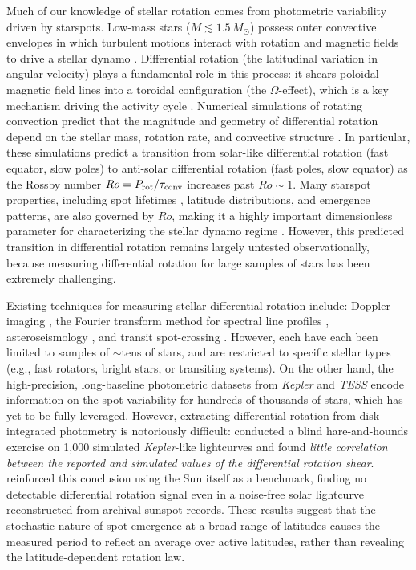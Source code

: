 \documentclass[preprint]{aastex702}
\newcommand{\kepler}{{\it Kepler}\xspace}
\newcommand{\tess}{{\it TESS}\xspace}
\begin{document}
Much of our knowledge of stellar rotation comes from photometric variability driven by starspots. Low-mass stars ($M \lesssim 1.5 \, M_{\odot}$) possess outer convective envelopes in which turbulent motions interact with rotation and magnetic fields to drive a stellar dynamo \citep{brun_differential_2017}. Differential rotation (the latitudinal variation in angular velocity) plays a fundamental role in this process: it shears poloidal magnetic field lines into a toroidal configuration (the $\Omega$-effect), which is a key mechanism driving the activity cycle \citep{noraz_impact_2022}. Numerical simulations of rotating convection predict that the magnitude and geometry of differential rotation depend on the stellar mass, rotation rate, and convective structure \citep{augustson_convection_2012,guerrero_differential_2013,kapyla_simulations_2023}. In particular, these simulations predict a transition from solar-like differential rotation (fast equator, slow poles) to anti-solar differential rotation (fast poles, slow equator) as the Rossby number $Ro = P_{\rm rot}/\tau_{\rm conv}$ increases past $Ro \sim 1$. Many starspot properties, including spot lifetimes \citep{giles_kepler_2017}, latitude distributions, and emergence patterns, are also governed by $Ro$, making it a highly important dimensionless parameter for characterizing the stellar dynamo regime \citep{gastine_solarlike_2013,noraz_hunting_2022}. However, this predicted transition in differential rotation remains largely untested observationally, because measuring differential rotation for large samples of stars has been extremely challenging.

Existing techniques for measuring stellar differential rotation include: Doppler imaging \citep{collier_cameron_differential_2007}, the Fourier transform method for spectral line profiles \citep{reiners_radius-dependent_2012}, asteroseismology \citep{benomar_asteroseismic_2018}, and transit spot-crossing \citep{morris_starspots_2017}. However, each have each been limited to samples of $\sim$tens of stars, and are restricted to specific stellar types (e.g., fast rotators, bright stars, or transiting systems). On the other hand, the high-precision, long-baseline photometric datasets from \kepler and \tess encode information on the spot variability for hundreds of thousands of stars, which has yet to be fully leveraged. However, extracting differential rotation from disk-integrated photometry is notoriously difficult: \citet{aigrain_testing_2015} conducted a blind hare-and-hounds exercise on 1,000 simulated \kepler-like lightcurves and found \emph{little correlation between the reported and simulated values of the differential rotation shear}. \citet{morris_solar_2019} reinforced this conclusion using the Sun itself as a benchmark, finding no detectable differential rotation signal even in a noise-free solar lightcurve reconstructed from archival sunspot records. These results suggest that the stochastic nature of spot emergence at a broad range of latitudes causes the measured period to reflect an average over active latitudes, rather than revealing the latitude-dependent rotation law.
\end{document}
